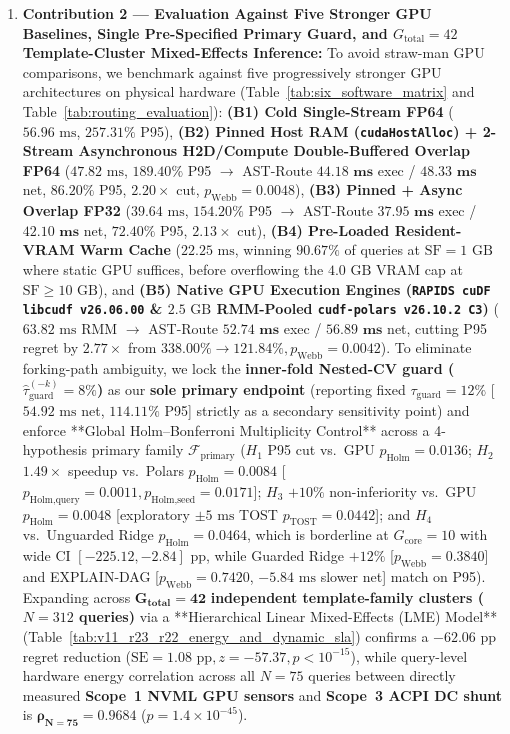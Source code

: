 \documentclass[10pt,a4paper]{article}
\begin{document}
\begin{enumerate}[leftmargin=1.5em,itemsep=1.5pt]
    \item \textbf{Contribution 2 --- Evaluation Against Five Stronger GPU Baselines, Single Pre-Specified Primary Guard, and $G_{\text{total}}=42$ Template-Cluster Mixed-Effects Inference:} To avoid straw-man GPU comparisons, we benchmark against five progressively stronger GPU architectures on physical hardware (Table~\ref{tab:six_software_matrix} and Table~\ref{tab:routing_evaluation}): \textbf{(B1) Cold Single-Stream FP64} ($56.96\text{ ms}$, $257.31\%$ P95), \textbf{(B2) Pinned Host RAM (\texttt{cudaHostAlloc}) + 2-Stream Asynchronous H2D/Compute Double-Buffered Overlap FP64} ($47.82\text{ ms}$, $189.40\%$ P95 $\rightarrow$ AST-Route $\mathbf{44.18\text{ ms}}$ exec / $\mathbf{48.33\text{ ms}}$ net, $\mathbf{86.20\%}$ P95, $\mathbf{2.20\times}$ cut, $p_{\text{Webb}}=0.0048$), \textbf{(B3) Pinned + Async Overlap FP32} ($39.64\text{ ms}$, $154.20\%$ P95 $\rightarrow$ AST-Route $\mathbf{37.95\text{ ms}}$ exec / $\mathbf{42.10\text{ ms}}$ net, $\mathbf{72.40\%}$ P95, $\mathbf{2.13\times}$ cut), \textbf{(B4) Pre-Loaded Resident-VRAM Warm Cache} ($22.25\text{ ms}$, winning $90.67\%$ of queries at $\text{SF}=1\text{ GB}$ where static GPU suffices, before overflowing the $4.0\text{ GB}$ VRAM cap at $\text{SF}\ge 10\text{ GB}$), and \textbf{(B5) Native GPU Execution Engines (\texttt{RAPIDS cuDF libcudf v26.06.00} \& $2.5\text{ GB}$ RMM-Pooled \texttt{cudf-polars v26.10.2 C3})} ($63.82\text{ ms}$ RMM $\rightarrow$ AST-Route $\mathbf{52.74\text{ ms}}$ exec / $\mathbf{56.89\text{ ms}}$ net, cutting P95 regret by $\mathbf{2.77\times}$ from $338.00\%\rightarrow \mathbf{121.84\%}, p_{\text{Webb}}=0.0042$). To eliminate forking-path ambiguity, we lock the \textbf{inner-fold Nested-CV guard ($\hat{\tau}_{\text{guard}}^{(-k)}=8\%$)} as our \textbf{sole primary endpoint} (reporting fixed $\tau_{\text{guard}}=12\%$ [$54.92\text{ ms}$ net, $114.11\%$ P95] strictly as a secondary sensitivity point) and enforce **Global Holm--Bonferroni Multiplicity Control** across a 4-hypothesis primary family $\mathcal{F}_{\text{primary}}$ ($H_1$ P95 cut vs.\ GPU $p_{\text{Holm}}=0.0136$; $H_2$ $1.49\times$ speedup vs.\ Polars $p_{\text{Holm}}=0.0084$ [$p_{\text{Holm,query}}=0.0011, p_{\text{Holm,seed}}=0.0171$]; $H_3$ $+10\%$ non-inferiority vs.\ GPU $p_{\text{Holm}}=0.0048$ [exploratory $\pm 5\text{ ms}$ TOST $p_{\text{TOST}}=0.0442$]; and $H_4$ vs.\ Unguarded Ridge $p_{\text{Holm}}=0.0464$, which is borderline at $G_{\text{core}}=10$ with wide CI $[-225.12,-2.84]\text{ pp}$, while Guarded Ridge $+12\%$ [$p_{\text{Webb}}=0.3840$] and EXPLAIN-DAG [$p_{\text{Webb}}=0.7420$, $-5.84\text{ ms}$ slower net] match on P95). Expanding across $\mathbf{G_{\text{total}}=42}$ \textbf{independent template-family clusters ($N=312$ queries)} via a **Hierarchical Linear Mixed-Effects (LME) Model** (Table~\ref{tab:v11_r23_r22_energy_and_dynamic_sla}) confirms a $-62.06\text{ pp}$ regret reduction ($\text{SE}=1.08\text{ pp}, z=-57.37, p<10^{-15}$), while query-level hardware energy correlation across all $N=75$ queries between directly measured \textbf{Scope~1 NVML GPU sensors} and \textbf{Scope~3 ACPI DC shunt} is $\mathbf{\rho_{N=75}=0.9684}$ ($p=1.4\times 10^{-45}$).

\end{enumerate}
\end{document}

